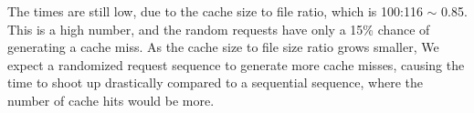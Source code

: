 \documentclass[12pt]{article}
\begin{document}
The times are still low, due to the cache size to file ratio, which is 100:116 $\sim$ 0.85. This is a high number, and the random requests have only a 15\% chance of generating a cache miss. As the cache size to file size ratio grows smaller, We expect a randomized request sequence to generate more cache misses, causing the time to shoot up drastically compared to a sequential sequence, where the number of cache hits would be more. 
\end{document}
